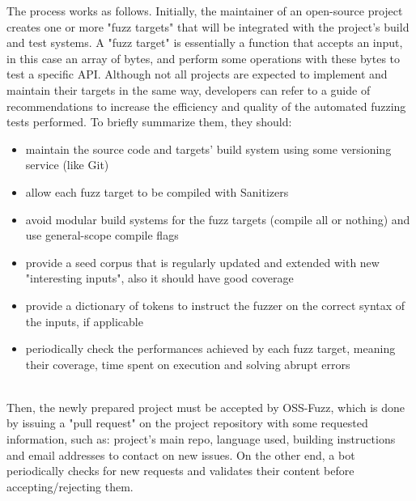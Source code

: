 \documentclass[Lau,oneside]{sapthesis}%
\begin{document}
\newpage
The process works as follows.
\newline \newline \newline
Initially, the maintainer of an open-source project creates one or more "fuzz targets" that will be integrated with the project's build and test systems. \cite{ref:libfuzzer_docs}
\newline
A "fuzz target" is essentially a function that accepts an input, in this case an array of bytes, and perform some operations with these bytes to test a specific API.
\newline
Although not all projects are expected to implement and maintain their targets in the same way, developers can refer to a guide of recommendations to increase the efficiency and quality of the automated fuzzing tests performed.
\newline
To briefly summarize them, they should:
\begin{itemize}
    \item maintain the source code and targets' build system using some versioning service (like Git)
    \item allow each fuzz target to be compiled with Sanitizers
    \item avoid modular build systems for the fuzz targets (compile all or nothing) and use general-scope compile flags
    \item provide a seed corpus that is regularly updated and extended with new "interesting inputs", also it should have good coverage
    \item provide a dictionary of tokens to instruct the fuzzer on the correct syntax of the inputs, if applicable
    \item periodically check the performances achieved by each fuzz target, meaning their coverage, time spent on execution and solving abrupt errors
\end{itemize}
\ \\
Then, the newly prepared project must be accepted by OSS-Fuzz, which is done by issuing a "pull request" on the project repository with some requested information, such as: project's main repo, language used, building instructions and email addresses to contact on new issues.
\newline
On the other end, a bot periodically checks for new requests and validates their content before accepting/rejecting them.
\newline \newline \newline
\end{document}
